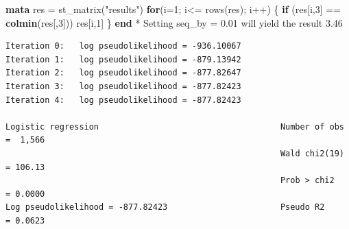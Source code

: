 \documentclass[
  10pt,
]{book}
\newenvironment{Shaded}{\begin{snugshade}}{\end{snugshade}}
\newcommand{\BaseNTok}[1]{\textcolor[rgb]{0.00,0.00,0.81}{#1}}
\newcommand{\KeywordTok}[1]{\textcolor[rgb]{0.13,0.29,0.53}{\textbf{#1}}}
\newcommand{\NormalTok}[1]{#1}
\newcommand{\StringTok}[1]{\textcolor[rgb]{0.31,0.60,0.02}{#1}}
\begin{document}
\begin{Shaded}
\begin{Highlighting}[]
\KeywordTok{mata}
\NormalTok{res = st\_matrix(}\StringTok{"results"}\NormalTok{)}
\KeywordTok{for}\NormalTok{(i=1; i\textless{}= }\BaseNTok{rows}\NormalTok{(res); i++) \{ }
  \KeywordTok{if}\NormalTok{ (res[i,3] == }\KeywordTok{colmin}\NormalTok{(res[,3])) res[i,1]}
\NormalTok{\}}
\KeywordTok{end}
\NormalTok{* Setting seq\_by = 0.01 will yield the result 3.46}
\end{Highlighting}
\end{Shaded}

\begin{verbatim}
Iteration 0:   log pseudolikelihood = -936.10067  
Iteration 1:   log pseudolikelihood = -879.13942  
Iteration 2:   log pseudolikelihood = -877.82647  
Iteration 3:   log pseudolikelihood = -877.82423  
Iteration 4:   log pseudolikelihood = -877.82423  

Logistic regression                                     Number of obs =  1,566
                                                        Wald chi2(19) = 106.13
                                                        Prob > chi2   = 0.0000
Log pseudolikelihood = -877.82423                       Pseudo R2     = 0.0623


\end{verbatim}
\end{document}
